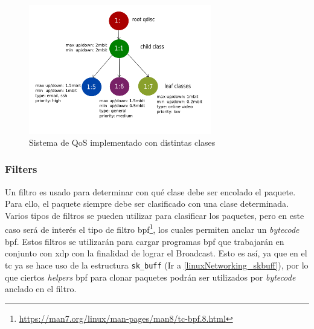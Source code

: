 \begin{figure}[ht]
    \centering
    \includegraphics[width=8cm]{archivos/img/teoria/tc_qdisc_example_implementation.png}
    \caption{Sistema de QoS implementado con distintas clases \cite{qdiscs}}
    \label{fig:linuxNet_tc}
\end{figure}

\subsubsection{Filters}

Un filtro es usado para determinar con qué clase debe ser encolado el paquete. Para ello, el paquete siempre debe ser clasificado con una clase determinada. Varios tipos de filtros se pueden utilizar para clasificar los paquetes, pero en este caso será de interés el tipo de filtro \gls{bpf}\footnote{\url{https://man7.org/linux/man-pages/man8/tc-bpf.8.html}}, los cuales permiten anclar un \textit{bytecode} \gls{bpf}. Estos filtros se utilizarán para cargar programas \gls{bpf} que trabajarán en conjunto con \gls{xdp} con la finalidad de lograr el Broadcast. Esto es así, ya que en el \gls{tc} ya se hace uso de la estructura \texttt{sk\_buff} (Ir a \ref{linuxNetworking_skbuff}), por lo que ciertos \textit{helpers} \gls{bpf} para clonar paquetes podrán ser utilizados por \textit{bytecode} anclado en el filtro.




